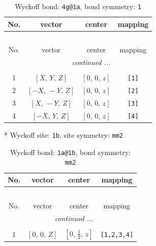 \documentclass[fleqn,8pt]{jsarticle}
\begin{document}
\begin{longtable}{cccc}
\caption{Wyckoff bond: {\tt 4g@1a}, bond symmetry: {\tt 1}}
 \\
 \hline \hline
No. & vector & center & mapping \\ \hline \endfirsthead

\multicolumn{3}{l}{\tablename\ \thetable{}} \\
 \hline \hline
No. & vector & center & mapping \\ \hline \endhead

 \hline \hline
\multicolumn{3}{r}{\footnotesize\it continued ...} \\ \endfoot

 \hline \hline
\multicolumn{3}{r}{} \\ \endlastfoot

1 & $\left[ X,\, Y,\, Z \right]$ & $\left[ 0,\, 0,\, z \right]$ & {\tt [1]} \\ \hline
2 & $\left[ - X,\, - Y,\, Z \right]$ & $\left[ 0,\, 0,\, z \right]$ & {\tt [2]} \\ \hline
3 & $\left[ X,\, - Y,\, Z \right]$ & $\left[ 0,\, 0,\, z \right]$ & {\tt [3]} \\ \hline
4 & $\left[ - X,\, Y,\, Z \right]$ & $\left[ 0,\, 0,\, z \right]$ & {\tt [4]} \\
\end{longtable}
* Wyckoff site: {\tt 1b}, site symmetry: {\tt mm2}
\renewcommand{\arraystretch}{1.2}
\begin{longtable}{cccc}
\caption{Wyckoff bond: {\tt 1a@1b}, bond symmetry: {\tt mm2}}
 \\
 \hline \hline
No. & vector & center & mapping \\ \hline \endfirsthead

\multicolumn{3}{l}{\tablename\ \thetable{}} \\
 \hline \hline
No. & vector & center & mapping \\ \hline \endhead

 \hline \hline
\multicolumn{3}{r}{\footnotesize\it continued ...} \\ \endfoot

 \hline \hline
\multicolumn{3}{r}{} \\ \endlastfoot

1 & $\left[ 0,\, 0,\, Z \right]$ & $\left[ 0,\, \frac{1}{2},\, z \right]$ & {\tt [1,2,3,4]} \\
\end{longtable}
\renewcommand{\arraystretch}{1.2}
\end{document}
